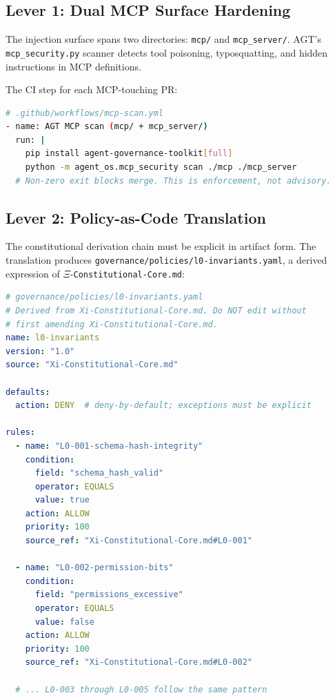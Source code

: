 \documentclass[12pt,a4paper]{article}
\theoremstyle{definition}
\theoremstyle{remark}
\begin{document}
\subsection{Lever 1: Dual MCP Surface Hardening}

The injection surface spans two directories: \texttt{mcp/} and
\texttt{mcp\_server/}. AGT's \texttt{mcp\_security.py} scanner detects
tool poisoning, typosquatting, and hidden instructions in MCP definitions.

The CI step for each MCP-touching PR:

\begin{lstlisting}[language=bash, caption={MCP Security Scan Gate}]
# .github/workflows/mcp-scan.yml
- name: AGT MCP scan (mcp/ + mcp_server/)
  run: |
    pip install agent-governance-toolkit[full]
    python -m agent_os.mcp_security scan ./mcp ./mcp_server
  # Non-zero exit blocks merge. This is enforcement, not advisory.
\end{lstlisting}

\subsection{Lever 2: Policy-as-Code Translation}

The constitutional derivation chain must be explicit in artifact form.
The translation produces \texttt{governance/policies/l0-invariants.yaml},
a derived expression of $\Xi$-\texttt{Constitutional-Core.md}:

\begin{lstlisting}[language=yaml, caption={L0 Invariants Policy Document (scaffold)}]
# governance/policies/l0-invariants.yaml
# Derived from Xi-Constitutional-Core.md. Do NOT edit without
# first amending Xi-Constitutional-Core.md.
name: l0-invariants
version: "1.0"
source: "Xi-Constitutional-Core.md"

defaults:
  action: DENY  # deny-by-default; exceptions must be explicit

rules:
  - name: "L0-001-schema-hash-integrity"
    condition:
      field: "schema_hash_valid"
      operator: EQUALS
      value: true
    action: ALLOW
    priority: 100
    source_ref: "Xi-Constitutional-Core.md#L0-001"

  - name: "L0-002-permission-bits"
    condition:
      field: "permissions_excessive"
      operator: EQUALS
      value: false
    action: ALLOW
    priority: 100
    source_ref: "Xi-Constitutional-Core.md#L0-002"

  # ... L0-003 through L0-005 follow the same pattern
\end{lstlisting}
\end{document}

